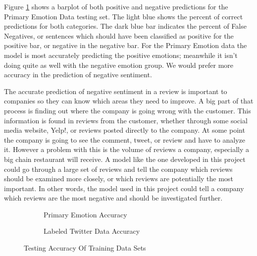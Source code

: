 \documentclass[titlepage,letterpaper]{article}
\begin{document}
Figure \ref{primemresult} shows a barplot of both positive and negative predictions for the Primary Emotion Data testing set. The light blue shows the percent of correct predictions for both categories. The dark blue bar indicates the percent of False Negatives, or sentences which should have been classified as positive for the positive bar, or negative in the negative bar. For the Primary Emotion data the model is most accurately predicting the positive emotions; meanwhile it isn't doing quite as well with the negative emotion group. We would prefer more accuracy in the prediction of negative sentiment. 

The accurate prediction of negative sentiment in a review is important to companies so they can know which areas they need to improve. A big part of that process is finding out where the company is going wrong with the customer. This information is found in reviews from the customer, whether through some social media website, Yelp!, or reviews posted directly to the company. At some point the company is going to see the comment, tweet, or review and have to analyze it. However a problem with this is the volume of reviews a company, especially a big chain restaurant will receive. A model like the one developed in this project could go through a large set of reviews and tell the company which reviews should be examined more closely, or which reviews are potentially the most important. In other words, the model used in this project could tell a company which reviews are the most negative and should be investigated further.   


		
\begin{figure}[]
	\hfill
	\vspace*{-1in}
	\centering
	\begin{adjustwidth}{-.75in}{-.75in}
		
 \begin{subfigure}{3in}
 	\centering
	\resizebox{3in}{!}{}
	\caption{Primary Emotion Accuracy}
	\label{primemresult}
\end{subfigure}
\hfill
\begin{subfigure}{3in}
	\centering
	\resizebox{3in}{!}{}
	\caption{Labeled Twitter Data Accuracy}
	\label{lbtwitresult}
\end{subfigure}
\hfill
\end{adjustwidth}
\caption{Testing Accuracy Of Training Data Sets}
\label{duo_chart}
\end{figure}
\end{document}

